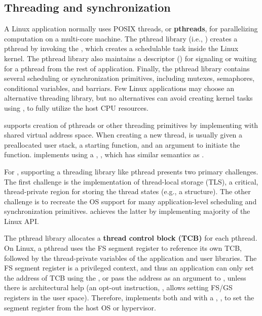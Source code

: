 \subsection{Threading and synchronization}
\label{sec:libos:thread}


A Linux application normally uses POSIX threads, or {\bf pthreads},
for parallelizing computation on a multi-core machine.
The pthread library (i.e., \libpthread{}) creates a pthread
by invoking the  \linuxapi{},
which creates a schedulable task inside the Linux kernel.
The pthread library also maintains a descriptor () for signaling or waiting for a pthread from the rest of application.
Finally,
the pthread library contains several scheduling or synchronization primitives,
including mutexes, semaphores, conditional variables,
and barriars.
Few Linux applications may choose an alternative threading library, but no alternatives can avoid creating kernel tasks using ,
to fully utilize the host CPU resources.



\thelibos{} supports creation of pthreads
or other threading primitives
by implementing  with shared virtual address space. %
When creating a new thread, 
 is usually given a preallocated user stack, a starting function, and an argument to initiate the function.
\thelibos{} implements  using a \hostapi{}, , which has similar semantics as .


For \thelibos{}, supporting a threading library like pthread
presents two primary challenges.
The first challenge is the implementation
of thread-local storage (TLS), a critical, thread-private region for storing the thread states (e.g., a  structure).
The other challenge is to recreate the OS support
for many application-level scheduling and synchronization primitives.
\thelibos{} achieves the latter by implementing majority of the Linux  API.



The pthread library allocates a {\bf thread control block (TCB)} for each pthread.
On \graphenearch{} Linux, a pthread %
uses the FS segment register
to reference its own TCB,
followed by the thread-private variables of the application
and user libraries. 
The FS segment register is a privileged context,
and thus an application can only set the address of TCB using the  \linuxapi{}, or pass the address as an argument to ,
unless there is architectural help (an opt-out \graphenearch{} instruction, , allows setting FS/GS registers in the user space).
Therefore, \thelibos{} implements both 
and  with a \hostapi{}, , to set the segment register from the host OS or hypervisor.


